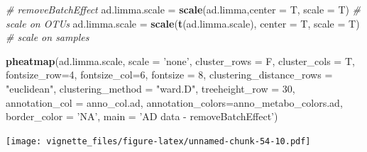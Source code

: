 \documentclass[]{book}
\newenvironment{Shaded}{\begin{snugshade}}{\end{snugshade}}
\newcommand{\KeywordTok}[1]{\textcolor[rgb]{0.13,0.29,0.53}{\textbf{#1}}}
\newcommand{\DataTypeTok}[1]{\textcolor[rgb]{0.13,0.29,0.53}{#1}}
\newcommand{\DecValTok}[1]{\textcolor[rgb]{0.00,0.00,0.81}{#1}}
\newcommand{\StringTok}[1]{\textcolor[rgb]{0.31,0.60,0.02}{#1}}
\newcommand{\CommentTok}[1]{\textcolor[rgb]{0.56,0.35,0.01}{\textit{#1}}}
\newcommand{\NormalTok}[1]{#1}
\begin{document}
\begin{Shaded}
\begin{Highlighting}[]
\CommentTok{# removeBatchEffect}
\NormalTok{ad.limma.scale =}\StringTok{ }\KeywordTok{scale}\NormalTok{(ad.limma,}\DataTypeTok{center =}\NormalTok{ T, }\DataTypeTok{scale =}\NormalTok{ T) }\CommentTok{# scale on OTUs}
\NormalTok{ad.limma.scale =}\StringTok{ }\KeywordTok{scale}\NormalTok{(}\KeywordTok{t}\NormalTok{(ad.limma.scale), }\DataTypeTok{center =}\NormalTok{ T, }\DataTypeTok{scale =}\NormalTok{ T) }\CommentTok{# scale on samples}

\KeywordTok{pheatmap}\NormalTok{(ad.limma.scale, }
         \DataTypeTok{scale =} \StringTok{'none'}\NormalTok{, }
         \DataTypeTok{cluster_rows =}\NormalTok{ F, }
         \DataTypeTok{cluster_cols =}\NormalTok{ T, }
         \DataTypeTok{fontsize_row=}\DecValTok{4}\NormalTok{, }\DataTypeTok{fontsize_col=}\DecValTok{6}\NormalTok{,}
         \DataTypeTok{fontsize =} \DecValTok{8}\NormalTok{,}
         \DataTypeTok{clustering_distance_rows =} \StringTok{"euclidean"}\NormalTok{,}
         \DataTypeTok{clustering_method =} \StringTok{"ward.D"}\NormalTok{,}
         \DataTypeTok{treeheight_row =} \DecValTok{30}\NormalTok{,}
         \DataTypeTok{annotation_col =}\NormalTok{ anno_col.ad,}
         \DataTypeTok{annotation_colors=}\NormalTok{anno_metabo_colors.ad,}
         \DataTypeTok{border_color =} \StringTok{'NA'}\NormalTok{,}
         \DataTypeTok{main =} \StringTok{'AD data - removeBatchEffect'}\NormalTok{)}
\end{Highlighting}
\end{Shaded}

\texttt{[image: vignette\_files/figure-latex/unnamed-chunk-54-10.pdf]}
\end{document}
